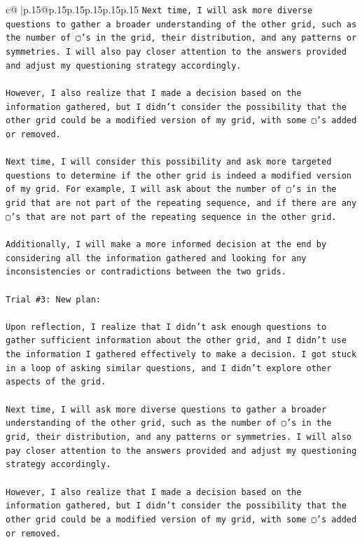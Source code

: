 \documentclass{article}
\begin{document}
{\begin{supertabular}{c@{$\;$}|p{.15\linewidth}@{}p{.15\linewidth}p{.15\linewidth}p{.15\linewidth}p{.15\linewidth}p{.15\linewidth}}
{{{\texttt{Next time, I will ask more diverse questions to gather a broader understanding of the other grid, such as the number of ▢'s in the grid, their distribution, and any patterns or symmetries. I will also pay closer attention to the answers provided and adjust my questioning strategy accordingly. } \\
\\ 
\texttt{However, I also realize that I made a decision based on the information gathered, but I didn't consider the possibility that the other grid could be a modified version of my grid, with some ▢'s added or removed. } \\
\\ 
\texttt{Next time, I will consider this possibility and ask more targeted questions to determine if the other grid is indeed a modified version of my grid. For example, I will ask about the number of ▢'s in the grid that are not part of the repeating sequence, and if there are any ▢'s that are not part of the repeating sequence in the other grid. } \\
\\ 
\texttt{Additionally, I will make a more informed decision at the end by considering all the information gathered and looking for any inconsistencies or contradictions between the two grids.} \\
\\ 
\texttt{Trial \#3: New plan: } \\
\\ 
\texttt{Upon reflection, I realize that I didn't ask enough questions to gather sufficient information about the other grid, and I didn't use the information I gathered effectively to make a decision. I got stuck in a loop of asking similar questions, and I didn't explore other aspects of the grid. } \\
\\ 
\texttt{Next time, I will ask more diverse questions to gather a broader understanding of the other grid, such as the number of ▢'s in the grid, their distribution, and any patterns or symmetries. I will also pay closer attention to the answers provided and adjust my questioning strategy accordingly. } \\
\\ 
\texttt{However, I also realize that I made a decision based on the information gathered, but I didn't consider the possibility that the other grid could be a modified version of my grid, with some ▢'s added or removed. } \\
\\ 
}}}
\end{supertabular}}
\end{document}
